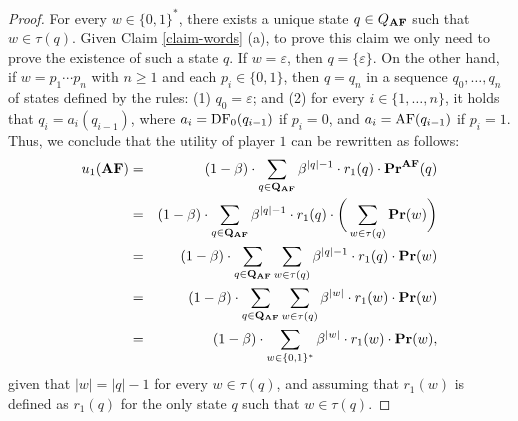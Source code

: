 \begin{proof}
For every $w \in \{0,1\}^*$, there exists a unique state $q \in Q_{\text{\rm {\bf AF}}}$ such that $w \in \tau(q)$. Given Claim \ref{claim-words} (a), to prove this claim we only need to prove the existence of such a state $q$. If $w = \varepsilon$, then $q = \{\varepsilon\}$. On the other hand, if $w = p_1 \cdots p_n$ with $n \geq 1$ and each $p_i \in \{0,1\}$, then $q = q_n$ in a sequence $q_0, \ldots, q_n$ of states defined by the rules: (1) $q_0 = \varepsilon$; and (2) for every $i \in \{1, \ldots, n\}$, it holds that $q_{i} = a_{i}(q_{i-1})$, where $a_{i} = \text{\rm DF}_0(q_{i-1})$ if $p_i = 0$, and $a_{i} = \text{\rm AF}(q_{i-1})$ if $p_i = 1$.
Thus, we conclude that the utility of player $1$ can be rewritten as follows:
\begin{eqnarray*}
u_1(\text{\rm {\bf AF}}) & = & (1-\beta) \cdot \sum_{q \in \mathbf{Q}_{\text{\rm {\bf AF}}}} \beta^{|q|-1} \cdot r_1(q) \cdot \mathbf{Pr}^{\text{\rm {\bf AF}}}(q)\\
& = & (1-\beta) \cdot \sum_{q \in \mathbf{Q}_{\text{\rm {\bf AF}}}} \beta^{|q|-1} \cdot r_1(q) \cdot \bigg(\sum_{w \in \tau(q)} \mathbf{Pr}(w)\bigg)\\
& = & (1-\beta) \cdot \sum_{q \in \mathbf{Q}_{\text{\rm {\bf AF}}}} \sum_{w \in \tau(q)} \beta^{|q|-1} \cdot r_1(q) \cdot \mathbf{Pr}(w)\\
& = & (1-\beta) \cdot \sum_{q \in \mathbf{Q}_{\text{\rm {\bf AF}}}} \sum_{w \in \tau(q)} \beta^{|w|} \cdot r_1(w) \cdot \mathbf{Pr}(w)\\
& = & (1-\beta) \cdot \sum_{w \in \{0,1\}^*} \beta^{|w|} \cdot r_1(w) \cdot \mathbf{Pr}(w),
\end{eqnarray*}
given that $|w| = |q| -1$ for every $w \in \tau(q)$, and assuming that $r_1(w)$ is defined as $r_1(q)$ for the only state $q$ such that $w \in \tau(q)$.







\end{proof}
